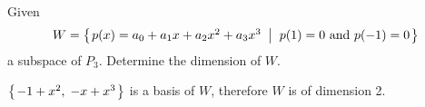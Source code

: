 
\begin{Exercise}[
name={},
title={}, 
difficulty=0,
origin={\cite{YL}}]
Given \[W=\mbox{$\left\{\hspace{0.1em}p(x)=a_0+a_1x+a_2x^2+a_3x^3 \;\;\middle|\;\; p(1)=0 \text{ and } p(-1)=0\hspace{0.1em}\right\}$}\] a subspace of $P_3$. Determine the dimension of $W$.

\end{Exercise}

\begin{Answer}
$\mbox{$\left\{\hspace{0.1em}-1+x^2,\;-x+x^3\hspace{0.1em}\right\}$}$ is a basis of $W$, therefore $W$ is of dimension 2.
\end{Answer}
